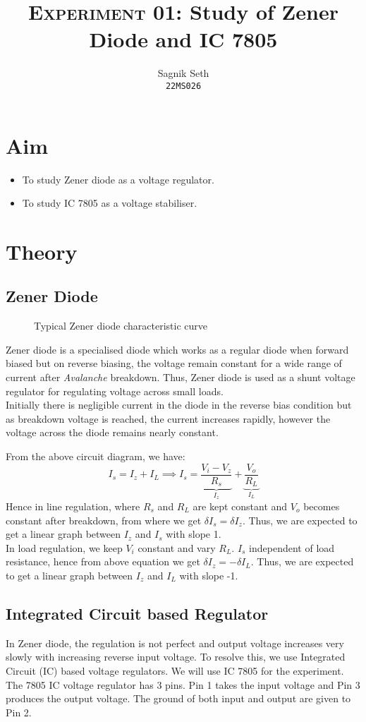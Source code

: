 \documentclass{scrartcl}
\title{
        \Large\textsc{Experiment 01: }
        \huge\textbf{Study of Zener Diode and IC 7805} \\
}
\author{{\Large Sagnik Seth} \\ \texttt{22MS026}}
\date{}
\begin{document}
\maketitle
\section{Aim}
\begin{itemize}
        \item To study Zener diode as a voltage regulator.
        \item To study IC 7805 as a voltage stabiliser.
\end{itemize}

\section{Theory}
\subsection{Zener Diode}
\begin{figure}[H]
        \centering
        
        \caption{Typical Zener diode characteristic curve}
\end{figure}
Zener diode is a specialised diode which works as a regular diode when forward biased but on reverse biasing, the voltage remain constant for a wide range of current after \textit{Avalanche} breakdown. Thus, Zener diode is used as a shunt voltage regulator for regulating voltage across small loads.\\[0.3cm]
Initially there is negligible current in the diode in the reverse bias condition but as breakdown voltage is reached, the current increases rapidly, however the voltage across the diode remains nearly constant.

\noindent
From the above circuit diagram, we have:
 $$I_s = I_z+I_L \implies I_s = \underbrace{\frac{V_i - V_z}{R_s}}_{I_z} + \underbrace{\frac{V_o}{R_L}}_{I_L}$$
Hence in line regulation, where $R_s$ and $R_L$ are kept constant and $V_o$ becomes constant after breakdown, from where we get $\delta I_s = \delta I_z$. Thus, we are expected to get a linear graph between $I_z$ and $I_s$ with slope 1.\\[0.3cm]
In load regulation, we keep $V_i$ constant and vary $R_L$. $I_s$ independent of load resistance, hence from above equation we get $\delta I_z = -\delta I_L$. Thus, we are expected to get a linear graph between $I_z$ and $I_L$ with slope -1.
\noindent
\subsection{Integrated Circuit based Regulator}
In Zener diode, the regulation is not perfect and output
voltage increases very slowly with increasing reverse input voltage. To resolve this, we use Integrated Circuit (IC) based voltage regulators. We will use IC 7805 for the experiment.
The 7805 IC voltage regulator has
3 pins. Pin 1 takes the input voltage and Pin 3 produces the output
voltage. The ground of both input and output are given to Pin 2.

\end{document}
